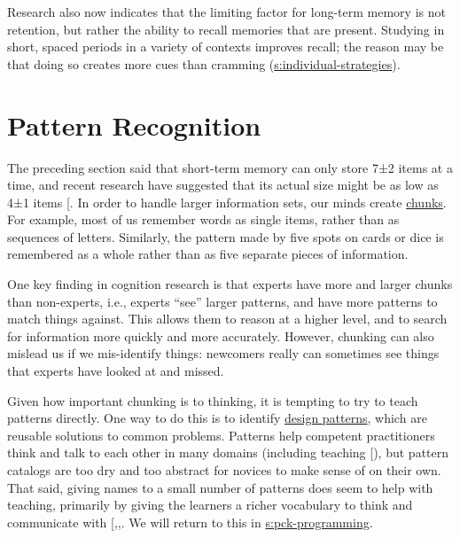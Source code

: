 Research also now indicates that the limiting factor for long-term
memory is not retention, but rather the ability to recall memories that
are present. Studying in short, spaced periods in a variety of contexts
improves recall; the reason may be that doing so creates more cues than
cramming (\protect\hyperlink{SECTION}{s:individual-strategies}).

\section{Pattern Recognition}\label{s:memory-pattern}

The preceding section said that short-term memory can only store
7±2 items at a time, and recent research have suggested that its
actual size might be as low as 4±1 items {[}\protect[\hyperlink{b:Dida2016}{Dida2016}]{]}. In
order to handle larger information sets, our minds create
\protect\hyperlink{g:chunking}{chunks}. For example, most of us remember words
as single items, rather than as sequences of letters. Similarly, the
pattern made by five spots on cards or dice is remembered as a whole
rather than as five separate pieces of information.

One key finding in cognition research is that experts have more and
larger chunks than non-experts, i.e., experts ``see'' larger patterns, and
have more patterns to match things against. This allows them to reason
at a higher level, and to search for information more quickly and more
accurately. However, chunking can also mislead us if we mis-identify
things: newcomers really can sometimes see things that experts have
looked at and missed.

Given how important chunking is to thinking, it is tempting to try to
teach patterns directly. One way to do this is to identify \href{https://en.wikipedia.org/wiki/Software_design_pattern}{design
patterns}, which are reusable solutions to common
problems. Patterns help competent practitioners think and talk to each
other in many domains (including teaching {[}\protect[\hyperlink{b:Berg2012}{Berg2012}]{]}), but
pattern catalogs are too dry and too abstract for novices to make
sense of on their own. That said, giving names to a small number of
patterns does seem to help with teaching, primarily by giving the
learners a richer vocabulary to think and communicate with
{[},,\protect[\hyperlink{b:Saja2006}{Saja2006}]{]}. We will
return to this in \protect\hyperlink{SECTION}{s:pck-programming}.

